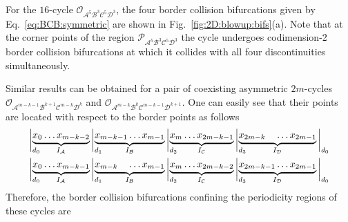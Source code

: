 \documentclass[10pt]{article}
\renewcommand{\P}{{\mathcal P}}
\newcommand{\A}{{\mathcal A}}
\newcommand{\B}{{\mathcal B}}
\newcommand{\C}{{\mathcal C}}
\newcommand{\D}{{\mathcal D}}
\newcommand{\LC}{{\mathcal O}}
\begin{document}
For the $16$-cycle $\LC_{\A^5\B^3\C^5\D^3}$, the four border collision
bifurcations given by Eq.~\eqref{eq:BCB:symmetric} are shown
in Fig.~\ref{fig:2D:blowup:bifs}(a). Note that
at the corner points of the region  $\P_{\A^5\B^3\C^5\D^3}$
the cycle undergoes codimension-2 border collision bifurcations
at which it collides with all four discontinuities simultaneously.



\medskip
Similar results can be obtained for a pair of coexisting asymmetric
$2m$-cycles $\LC_{\A^{m-k-1}\B^{k+1}\C^{m-k}\D^k}$ and
$\LC_{\A^{m-k}\B^k\C^{m-k-1}\D^{k+1}}$. One can easily see that their
points are located with respect to the border points as follows
\begin{align}
	 &
	\raisebox{-1.2ex}{$\bigg|_{d_0}$\hspace*{-1em}}
	\underbrace{x_0 \dots x_{m-k-2}}_{I_\A}
	\raisebox{-1.2ex}{$\bigg|_{d_1}$\hspace*{-1em}}
	\underbrace{x_{m-k-1} \dots x_{m-1}}_{I_\B}
	\raisebox{-1.2ex}{$\bigg|_{d_2}$\hspace*{-1em}}
	\underbrace{x_{m} \dots x_{2m-k-1}}_{I_\C}
	\raisebox{-1.2ex}{$\bigg|_{d_3}$\hspace*{-1em}}
	\underbrace{x_{2m-k\phantom{-1}} \dots x_{2m-1}}_{I_\D}
	\raisebox{-1.2ex}{$\bigg|_{d_0}$} \\
	 &
	\raisebox{-1.2ex}{$\bigg|_{d_0}$\hspace*{-1em}}
	\underbrace{x_0 \dots x_{m-k-1}}_{I_\A}
	\raisebox{-1.2ex}{$\bigg|_{d_1}$\hspace*{-1em}}
	\underbrace{x_{m-k\phantom{-1}} \dots x_{m-1}}_{I_\B}
	\raisebox{-1.2ex}{$\bigg|_{d_2}$\hspace*{-1em}}
	\underbrace{x_{m} \dots x_{2m-k-2}}_{I_\C}
	\raisebox{-1.2ex}{$\bigg|_{d_3}$\hspace*{-1em}}
	\underbrace{x_{2m-k-1} \dots x_{2m-1}}_{I_\D}
	\raisebox{-1.2ex}{$\bigg|_{d_0}$}
\end{align}
Therefore, the  border collision bifurcations
confining the periodicity regions of these cycles are
\end{document}
